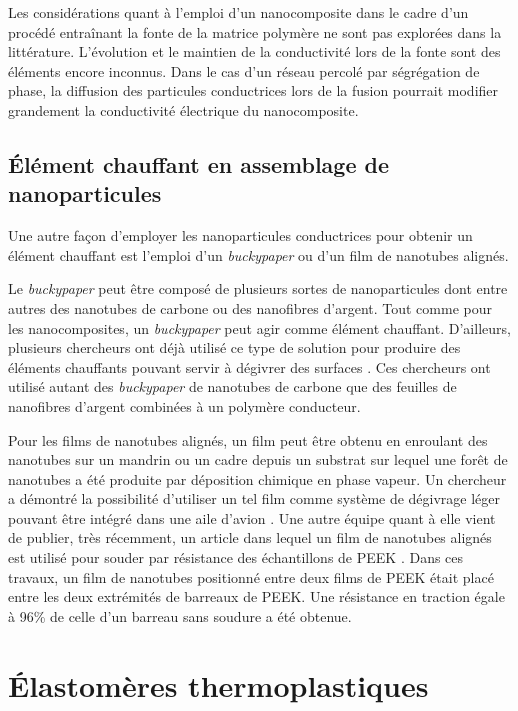 Les considérations quant à l'emploi d'un nanocomposite dans le cadre d'un procédé entraînant la fonte de la matrice polymère ne sont pas explorées dans la littérature. 
L'évolution et le maintien de la conductivité lors de la fonte sont des éléments encore inconnus. 
Dans le cas d'un réseau percolé par ségrégation de phase, la diffusion des particules conductrices lors de la fusion pourrait modifier grandement la conductivité électrique du nanocomposite. 

\subsection{Élément chauffant en assemblage de nanoparticules}

Une autre façon d'employer les nanoparticules conductrices pour obtenir un élément chauffant est l'emploi d'un \textit{buckypaper} ou d'un film de nanotubes alignés. 

Le \textit{buckypaper} peut être composé de plusieurs sortes de nanoparticules dont entre autres des nanotubes de carbone ou des nanofibres d'argent. 
Tout comme pour les nanocomposites, un \textit{buckypaper} peut agir comme élément chauffant. 
D'ailleurs, plusieurs chercheurs ont déjà utilisé ce type de solution pour produire des éléments chauffants pouvant servir à dégivrer des surfaces \cite{Pyo2016,Chu2014,Zhang2013}.
Ces chercheurs ont utilisé autant des \textit{buckypaper} de nanotubes de carbone que des feuilles de nanofibres d'argent combinées à un polymère conducteur. 

Pour les films de nanotubes alignés, un film peut être obtenu en enroulant des nanotubes sur un mandrin ou un cadre depuis un substrat sur lequel une forêt de nanotubes a été produite par déposition chimique en phase vapeur. 
Un chercheur a démontré la possibilité d'utiliser un tel film comme système de dégivrage léger pouvant être intégré dans une aile d'avion \cite{Yao2018}.
Une autre équipe quant à elle vient de publier, très récemment, un article dans lequel un film de nanotubes alignés est utilisé pour souder par résistance des échantillons de PEEK \cite{Russello2019}. 
Dans ces travaux, un film de nanotubes positionné entre deux films de PEEK était placé entre les deux extrémités de barreaux de PEEK. 
Une résistance en traction égale à 96\% de celle d'un barreau sans soudure a été obtenue. 

\FloatBarrier
\section{Élastomères thermoplastiques}  


